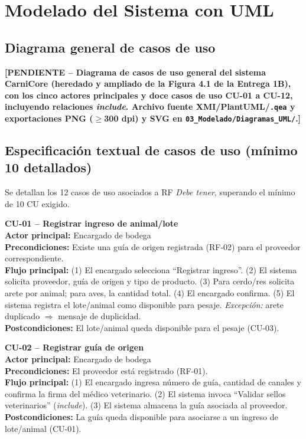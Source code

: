 \documentclass[11pt,a4paper]{article}
\newcommand{\PENDIENTE}[1]{\textcolor{pendiente}{\textbf{[PENDIENTE -- #1]}}}
\begin{document}
\section{Modelado del Sistema con UML}
\subsection{Diagrama general de casos de uso}
\PENDIENTE{Diagrama de casos de uso general del sistema CarniCore (heredado y ampliado de la Figura 4.1 de la Entrega 1B), con los cinco actores principales y doce casos de uso CU-01 a CU-12, incluyendo relaciones \textit{include}. Archivo fuente XMI/PlantUML/\texttt{.qea} y exportaciones PNG ($\geq$300 dpi) y SVG en \texttt{03\_Modelado/Diagramas\_UML/}.}

\subsection{Especificación textual de casos de uso (mínimo 10 detallados)}
Se detallan los 12 casos de uso asociados a RF \textit{Debe tener}, superando el mínimo de 10 CU exigido.

\newcommand{\cuitem}[6]{%
\noindent\textbf{#1 -- #2}\\
\textbf{Actor principal:} #3\\
\textbf{Precondiciones:} #4\\
\textbf{Flujo principal:} #5\\
\textbf{Postcondiciones:} #6
\vspace{0.35cm}
}

\cuitem{CU-01}{Registrar ingreso de animal/lote}{Encargado de bodega}{Existe una guía de origen registrada (RF-02) para el proveedor correspondiente.}{
(1) El encargado selecciona ``Registrar ingreso''. (2) El sistema solicita proveedor, guía de origen y tipo de producto. (3) Para cerdo/res solicita arete por animal; para aves, la cantidad total. (4) El encargado confirma. (5) El sistema registra el lote/animal como disponible para pesaje. \textit{Excepción:} arete duplicado $\Rightarrow$ mensaje de duplicidad.}{
El lote/animal queda disponible para el pesaje (CU-03).}

\cuitem{CU-02}{Registrar guía de origen}{Encargado de bodega}{El proveedor está registrado (RF-01).}{
(1) El encargado ingresa número de guía, cantidad de canales y confirma la firma del médico veterinario. (2) El sistema invoca ``Validar sellos veterinarios'' (\textit{include}). (3) El sistema almacena la guía asociada al proveedor.}{
La guía queda disponible para asociarse a un ingreso de lote/animal (CU-01).}
\end{document}
